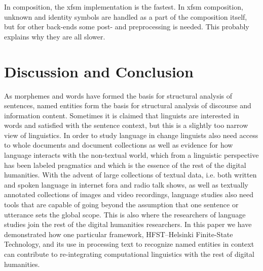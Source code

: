 \documentclass{llncs}
\begin{document}
In composition, the xfsm implementation is the fastest. In xfsm composition, unknown and identity
symbols are handled as a part of the composition itself, but for other back-ends some post- and preprocessing is
needed. This probably explains why they are all slower.

\section{Discussion and Conclusion}\label{sec:discussion}

As morphemes and words have formed the basis for structural analysis
of sentences, named entities form the basis for structural analysis of
discourse and information content. Sometimes it is claimed that
linguists are interested in words and satisfied with the sentence
context, but this is a slightly too narrow view of linguistics. In
order to study language in change linguists also need access to whole
documents and document collections as well as evidence for how
language interacts with the non-textual world, which from a linguistic
perspective has been labeled pragmatics and which is the essence of
the rest of the digital humanities. With the advent of large
collections of textual data, i.e. both written and spoken language in
internet fora and radio talk shows, as well as textually annotated
collections of images and video recordings, language studies also need
tools that are capable of going beyond the assumption that one
sentence or utterance sets the global scope. This is also where the
researchers of language studies join the rest of the digital
humanities researchers. In this paper we have demonstrated how one
particular framework, HFST--Helsinki Finite-State Technology, and its
use in processing text to recognize named entities in context can
contribute to re-integrating computational linguistics with the rest
of digital humanities.




\end{document}
